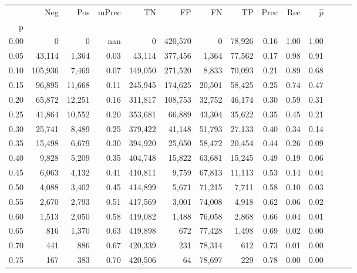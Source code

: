 \begin{tabular}{rrrrrrrrrrrrrr}
\toprule
{} &      Neg &     Pos & mPrec &       TN &       FP &      FN &      TP &  Prec &   Rec & $\hat{p}$ \\
p    &          &         &       &          &          &         &         &       &       &           \\
\midrule
0.00 &        0 &       0 &   nan &        0 &  420,570 &       0 &  78,926 &  0.16 &  1.00 &      1.00 \\
0.05 &   43,114 &   1,364 &  0.03 &   43,114 &  377,456 &   1,364 &  77,562 &  0.17 &  0.98 &      0.91 \\
0.10 &  105,936 &   7,469 &  0.07 &  149,050 &  271,520 &   8,833 &  70,093 &  0.21 &  0.89 &      0.68 \\
0.15 &   96,895 &  11,668 &  0.11 &  245,945 &  174,625 &  20,501 &  58,425 &  0.25 &  0.74 &      0.47 \\
0.20 &   65,872 &  12,251 &  0.16 &  311,817 &  108,753 &  32,752 &  46,174 &  0.30 &  0.59 &      0.31 \\
0.25 &   41,864 &  10,552 &  0.20 &  353,681 &   66,889 &  43,304 &  35,622 &  0.35 &  0.45 &      0.21 \\
0.30 &   25,741 &   8,489 &  0.25 &  379,422 &   41,148 &  51,793 &  27,133 &  0.40 &  0.34 &      0.14 \\
0.35 &   15,498 &   6,679 &  0.30 &  394,920 &   25,650 &  58,472 &  20,454 &  0.44 &  0.26 &      0.09 \\
0.40 &    9,828 &   5,209 &  0.35 &  404,748 &   15,822 &  63,681 &  15,245 &  0.49 &  0.19 &      0.06 \\
0.45 &    6,063 &   4,132 &  0.41 &  410,811 &    9,759 &  67,813 &  11,113 &  0.53 &  0.14 &      0.04 \\
0.50 &    4,088 &   3,402 &  0.45 &  414,899 &    5,671 &  71,215 &   7,711 &  0.58 &  0.10 &      0.03 \\
0.55 &    2,670 &   2,793 &  0.51 &  417,569 &    3,001 &  74,008 &   4,918 &  0.62 &  0.06 &      0.02 \\
0.60 &    1,513 &   2,050 &  0.58 &  419,082 &    1,488 &  76,058 &   2,868 &  0.66 &  0.04 &      0.01 \\
0.65 &      816 &   1,370 &  0.63 &  419,898 &      672 &  77,428 &   1,498 &  0.69 &  0.02 &      0.00 \\
0.70 &      441 &     886 &  0.67 &  420,339 &      231 &  78,314 &     612 &  0.73 &  0.01 &      0.00 \\
0.75 &      167 &     383 &  0.70 &  420,506 &       64 &  78,697 &     229 &  0.78 &  0.00 &      0.00 \\

\end{tabular}

